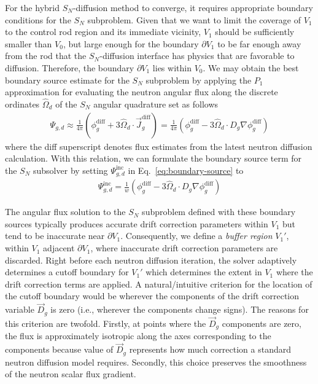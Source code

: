 \documentclass[letterpaper]{mc2025}
\begin{document}
For the hybrid $S_N$-diffusion method to converge, it requires appropriate boundary conditions for
the $S_N$ subproblem. Given that we want to limit the coverage of $V_1$ to the control rod region
and its immediate vicinity, $V_1$ should be sufficiently smaller than $V_0$, but large enough for
the boundary $\partial V_1$ to be far enough away from the rod that the $S_N$-diffusion interface
has physics that are favorable to diffusion. Therefore, the boundary $\partial V_1$ 
lies within $V_0$. We may obtain the best boundary source estimate for the $S_N$ subproblem by
applying the $P_1$ approximation for evaluating the neutron angular flux along
the discrete ordinates $\hat{\Omega}_d$ of the $S_N$ angular quadrature set as follows
%
\begin{align}
  \Psi_{g,d} \approx \frac{1}{4\pi}\left(\phi^\text{diff}_g+3\hat{\Omega}_d\cdot
  \vec{J}^\text{diff}_g\right)
  =\frac{1}{4\pi}\left(\phi^\text{diff}_g-3\hat{\Omega}_d\cdot D_g\nabla\phi^\text{diff}_g\right)
\end{align}
%
where the diff superscript denotes flux estimates from the latest neutron diffusion calculation.
With this relation, we can formulate the boundary source term for the $S_N$ subsolver by setting
$\Psi^\text{inc}_{g,d}$ in Eq.\ \ref{eq:boundary-source} to
%
\begin{gather}
  \Psi^\text{inc}_{g,d} = \frac{1}{w}
  \left(\phi^\text{diff}_g-3\hat{\Omega}_d\cdot D_g\nabla\phi^\text{diff}_g\right)
\end{gather}

The angular flux solution to the $S_N$ subproblem defined with these boundary sources typically
produces accurate drift correction parameters within $V_1$ but tend to be inaccurate
near $\partial V_1$. Consequently, we define a \textit{buffer region}
$V_1'$, within $V_1$ adjacent $\partial V_1$, where inaccurate drift correction parameters are
discarded. Right before each
neutron diffusion iteration, the solver adaptively determines a cutoff boundary for $V_1'$ which
determines the extent in $V_1$ where the drift correction terms are applied.
A natural/intuitive criterion for the location of the cutoff boundary
would be wherever the components of the drift correction variable $\vec{D}_g$ is zero (i.e.,
wherever the components change signs). The reasons for this criterion are twofold. Firstly, at
points where the $\vec{D}_g$ components are zero, the flux is approximately isotropic along the
axes corresponding to the components because value of $\vec{D}_g$ represents how much correction a
standard neutron diffusion model requires. Secondly, this choice preserves the smoothness of the
neutron scalar flux gradient.
\end{document}
